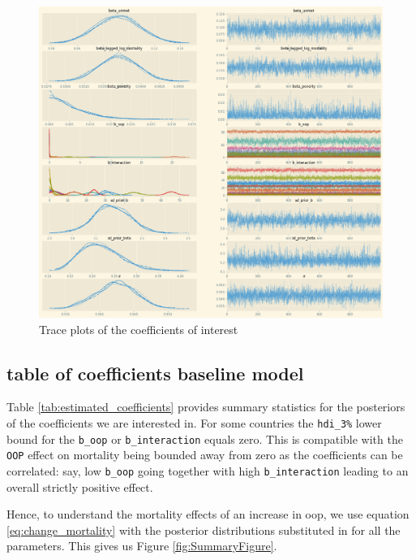 \documentclass[a4paper,12pt]{article}
\begin{document}
\begin{figure}[htbp]
\centering
\includegraphics[width=.9\linewidth]{./figures/trace_plot_baseline.png}
\caption{\label{fig:Trace}Trace plots of the coefficients of interest}
\end{figure}


\subsection{table of coefficients baseline model}
\label{sec:org09412ed}

Table \ref{tab:estimated_coefficients} provides summary statistics for the posteriors of the coefficients we are interested in. For some countries the \texttt{hdi\_3\%} lower bound for the \texttt{b\_oop} or \texttt{b\_interaction} equals zero. This is compatible with the \texttt{OOP} effect on mortality being bounded away from zero as the coefficients can be correlated: say, low \texttt{b\_oop} going together with high \texttt{b\_interaction} leading to an overall strictly positive effect.

Hence, to understand the mortality effects of an increase in oop, we use equation \eqref{eq:change_mortality} with the posterior distributions substituted in for all the parameters. This gives us Figure \ref{fig:SummaryFigure}.
\end{document}
